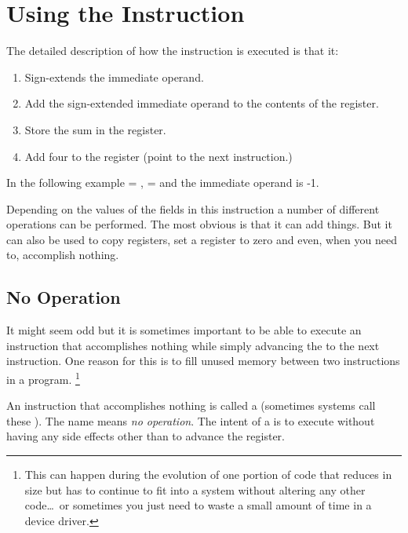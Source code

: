 \section{Using the  Instruction}
\label{uguide:addi}

%
The detailed description of how the  instruction is executed
is that it:
\begin{enumerate}
\item Sign-extends the immediate operand.
\item Add the sign-extended immediate operand to the contents of the  register.
\item Store the sum in the  register.
\item Add four to the  register (point to the next instruction.)
\end{enumerate}

In the following example  = ,  =  and
the immediate operand is -1.


Depending on the values of the fields in this instruction a number of
different operations can be performed.  The most obvious is that it
can add things.  But it can also be used to copy registers, set a 
register to zero and even, when you need to, accomplish nothing.

\subsection{No Operation}

It might seem odd but it is sometimes important to be able to execute
an instruction that accomplishes nothing while simply advancing the 
 to the next instruction.  One reason for this is to fill 
unused memory between two instructions in a program.%
\footnote{This can happen during the evolution of one portion of code 
that reduces in size but has to continue to fit into a system without 
altering any other code\ldots\ or sometimes you just need to waste 
a small amount of time in a device driver.}

An instruction that accomplishes nothing is called a 
(sometimes systems call these ).  The name means 
{\em no operation}.  
The intent of a  is to execute without having any side effects 
other than to advance the  register.

